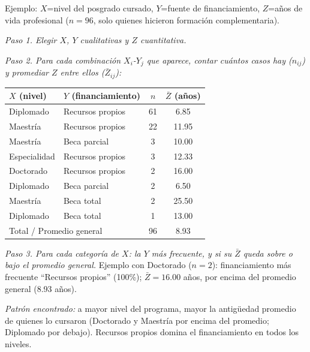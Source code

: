 \documentclass[12pt]{article}
\begin{document}
Ejemplo: $X$=nivel del posgrado cursado, $Y$=fuente de financiamiento, $Z$=años de vida profesional ($n=96$, solo quienes hicieron formación complementaria).

\textit{Paso 1. Elegir $X$, $Y$ cualitativas y $Z$ cuantitativa.}

\textit{Paso 2. Para cada combinación $X_i$-$Y_j$ que aparece, contar cuántos casos hay ($n_{ij}$) y promediar $Z$ entre ellos ($\bar{Z}_{ij}$):}

\begin{tabular}{llcc}
\toprule
$X$ (nivel) & $Y$ (financiamiento) & $n$ & $\bar{Z}$ (años) \\
\midrule
Diplomado & Recursos propios & 61 & 6.85 \\
Maestría & Recursos propios & 22 & 11.95 \\
Maestría & Beca parcial & 3 & 10.00 \\
Especialidad & Recursos propios & 3 & 12.33 \\
Doctorado & Recursos propios & 2 & 16.00 \\
Diplomado & Beca parcial & 2 & 6.50 \\
Maestría & Beca total & 2 & 25.50 \\
Diplomado & Beca total & 1 & 13.00 \\
\midrule
\multicolumn{2}{l}{Total / Promedio general} & 96 & 8.93 \\
\bottomrule
\end{tabular}

\textit{Paso 3. Para cada categoría de $X$: la $Y$ más frecuente, y si su $\bar{Z}$ queda sobre o bajo el promedio general.} Ejemplo con Doctorado ($n=2$): financiamiento más frecuente ``Recursos propios'' (100\%); $\bar{Z}=16.00$ años, por encima del promedio general (8.93 años).

\textit{Patrón encontrado:} a mayor nivel del programa, mayor la antigüedad promedio de quienes lo cursaron (Doctorado y Maestría por encima del promedio; Diplomado por debajo). Recursos propios domina el financiamiento en todos los niveles.
\end{document}
